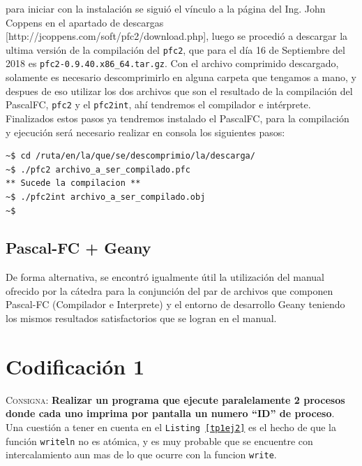\documentclass{article}
\begin{document}
para iniciar con la instalaci\'on se sigui\'o el v\'inculo a la p\'agina del Ing. John Coppens en el apartado de descargas [http://jcoppens.com/soft/pfc2/download.php], luego se procedi\'o a descargar la ultima versi\'on de la compilaci\'on del \texttt{pfc2}, que para el d\'ia 16 de Septiembre del 2018 es \texttt{pfc2-0.9.40.x86\_64.tar.gz}. Con el archivo comprimido descargado, solamente es necesario descomprimirlo en alguna carpeta que tengamos a mano, y despues de eso utilizar los dos archivos que son el resultado de la compilaci\'on del PascalFC, \texttt{pfc2} y el \texttt{pfc2int}, ah\'i tendremos el compilador e int\'erprete.\\

Finalizados estos pasos ya tendremos instalado el PascalFC, para la compilaci\'on y ejecuci\'on ser\'a necesario realizar en consola los siguientes pasos:

\begin{lstlisting}[caption={Compilaci\'on de y ejecuci\'on con pfc2}]
~$ cd /ruta/en/la/que/se/descomprimio/la/descarga/
~$ ./pfc2 archivo_a_ser_compilado.pfc
** Sucede la compilacion **
~$ ./pfc2int archivo_a_ser_compilado.obj
~$
\end{lstlisting}
\subsection{Pascal-FC + Geany}
De forma alternativa, se encontr\'o igualmente \'util la utilizaci\'on del manual ofrecido por la c\'atedra para la conjunci\'on del par de archivos que componen Pascal-FC (Compilador e Interprete) y el entorno de desarrollo Geany teniendo los mismos resultados satisfactorios que se logran en el manual.

\section{Codificaci\'on 1}
\label{sec:ej2}
\textsc{Consigna}: \textbf{Realizar un programa que ejecute paralelamente 2 procesos donde cada uno imprima por pantalla un numero ``ID'' de proceso}.\\



Una cuesti\'on a tener en cuenta en el \texttt{Listing \ref{tp1ej2}} es  el hecho de que la funci\'on \texttt{writeln} no es at\'omica, y es muy probable que se encuentre con intercalamiento aun mas de lo que ocurre con la funcion \texttt{write}.
\end{document}
